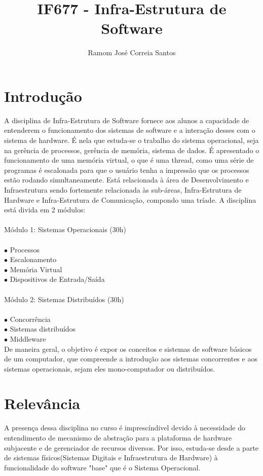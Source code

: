 \documentclass[10pt]{article}
\title{IF677 - Infra-Estrutura de Software}
\author{Ramom José Correia Santos}
\begin{document}
\maketitle

\section{Introdução}
	A disciplina de Infra-Estrutura de Software fornece aos alunos a capacidade de entenderem o funcionamento dos sistemas de software e a interação desses com o sistema de hardware. É nela que estuda-se o trabalho do sistema operacional, seja na gerência de processos, gerência de memória, sistema de dados. É apresentado o funcionamento de uma memória virtual, o que é uma thread, como uma série de programas é escalonada para que o usuário tenha a impressão que os processos estão rodando simultaneamente. Está relacionada à área de Desenvolvimento e Infraestrutura sendo fortemente relacionada às sub-áreas, Infra-Estrutura de Hardware e Infra-Estrutura de Comunicação, compondo uma tríade.
A disciplina está divida em 2 módulos:
\\ \\
Módulo 1: Sistemas Operacionais (30h) \\ \\
$\bullet$ Processos \\
$\bullet$ Escalonamento \\
$\bullet$ Memória Virtual \\
$\bullet$ Dispositivos de Entrada/Saída \\ \\
Módulo 2: Sistemas Distribuídos (30h) \\ \\
$\bullet$ Concorrência \\
$\bullet$ Sistemas distribuídos \\
$\bullet$ Middleware \\ 

De maneira geral, o objetivo é expor os conceitos e sistemas de software básicos de um computador, que compreende a introdução aos sistemas concorrentes e aos sistemas operacionais, sejam eles mono-computador ou distribuídos. 



\section{Relevância}
\indent A presença dessa disciplina no curso é imprescíndivel devido à necessidade do entendimento de mecanismo de abstração para a plataforma de hardware subjacente e de gerenciador de recursos diversos. Por isso, estuda-se desde a parte de sistemas físicos(Sistemas Digitais e Infraestrutura de Hardware) à funcionalidade do software "base" que é o Sistema Operacional. \cite{tanenbaum2009sistemas} \cite{tanenbaum1995sistemas} \\
\end{document}
